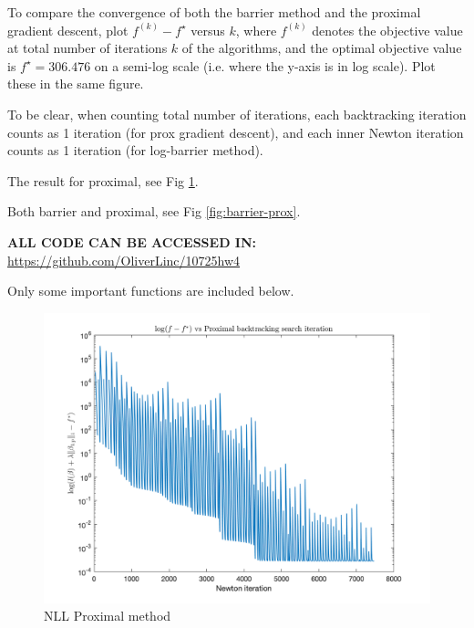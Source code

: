 \documentclass{article}
\theoremstyle{remark}
\theoremstyle{definition}
\begin{document}
\begin{enumerate}[(a)]
\begin{enumerate}
	    To compare the convergence of both the barrier method and the proximal gradient descent, plot $f^{(k)} - f^{\star}$ versus $k$,  where $f^{(k)}$ denotes the objective value at total number of iterations $k$ of the algorithms, and the optimal objective value is $f^\star = 306.476$ on a semi-log scale (i.e. where the y-axis is in log scale). Plot these in the same figure. 

      To be clear, when counting total number of iterations, each backtracking iteration counts as 1 iteration (for prox gradient descent), and each inner Newton iteration counts as 1 iteration (for log-barrier method).
      {
      \color{blue}
      
      The result for proximal, see Fig \ref{fig:nll_proximal}.
      
      Both barrier and proximal, see Fig \ref{fig:barrier-prox}.
      
      \textbf{ALL CODE CAN BE ACCESSED IN:} \url{https://github.com/OliverLinc/10725hw4} 
      
      Only some important functions are included below.
        \begin{figure}
            \centering
            \includegraphics[scale=.3]{prox.png}
            \caption{NLL Proximal method}
            \label{fig:nll_proximal}
        \end{figure}
        
}
\end{enumerate}
\end{enumerate}
\end{document}
